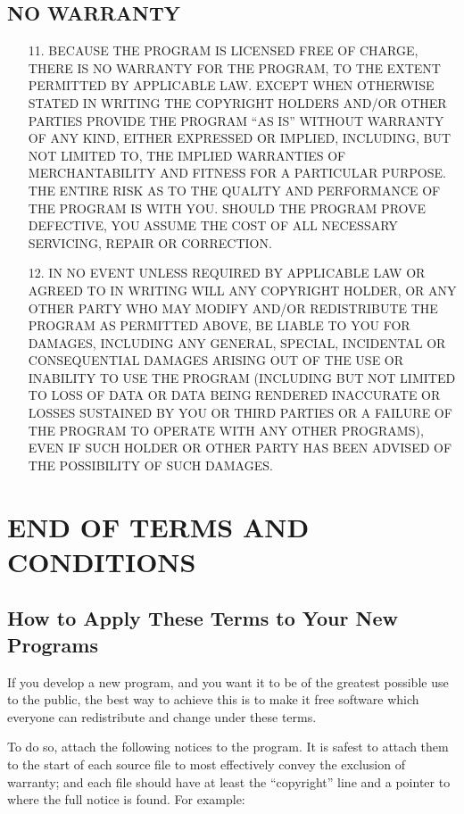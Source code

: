 \documentclass[oneside,english]{book}
\begin{document}
\subsection*{NO WARRANTY }

\begin{itemize}

\item[11.]BECAUSE THE PROGRAM IS LICENSED FREE OF CHARGE, THERE IS
NO WARRANTY FOR THE PROGRAM, TO THE EXTENT PERMITTED BY APPLICABLE
LAW. EXCEPT WHEN OTHERWISE STATED IN WRITING THE COPYRIGHT HOLDERS
AND/OR OTHER PARTIES PROVIDE THE PROGRAM ``AS IS'' WITHOUT WARRANTY
OF ANY KIND, EITHER EXPRESSED OR IMPLIED, INCLUDING, BUT NOT LIMITED
TO, THE IMPLIED WARRANTIES OF MERCHANTABILITY AND FITNESS FOR A PARTICULAR
PURPOSE. THE ENTIRE RISK AS TO THE QUALITY AND PERFORMANCE OF THE
PROGRAM IS WITH YOU. SHOULD THE PROGRAM PROVE DEFECTIVE, YOU ASSUME
THE COST OF ALL NECESSARY SERVICING, REPAIR OR CORRECTION.

\item[12.]IN NO EVENT UNLESS REQUIRED BY APPLICABLE LAW OR AGREED
TO IN WRITING WILL ANY COPYRIGHT HOLDER, OR ANY OTHER PARTY WHO MAY
MODIFY AND/OR REDISTRIBUTE THE PROGRAM AS PERMITTED ABOVE, BE LIABLE
TO YOU FOR DAMAGES, INCLUDING ANY GENERAL, SPECIAL, INCIDENTAL OR
CONSEQUENTIAL DAMAGES ARISING OUT OF THE USE OR INABILITY TO USE THE
PROGRAM (INCLUDING BUT NOT LIMITED TO LOSS OF DATA OR DATA BEING RENDERED
INACCURATE OR LOSSES SUSTAINED BY YOU OR THIRD PARTIES OR A FAILURE
OF THE PROGRAM TO OPERATE WITH ANY OTHER PROGRAMS), EVEN IF SUCH HOLDER
OR OTHER PARTY HAS BEEN ADVISED OF THE POSSIBILITY OF SUCH DAMAGES.

\end{itemize}


\section*{END OF TERMS AND CONDITIONS }


\subsection*{How to Apply These Terms to Your New Programs}

If you develop a new program, and you want it to be of the greatest
possible use to the public, the best way to achieve this is to make
it free software which everyone can redistribute and change under
these terms.

To do so, attach the following notices to the program. It is safest
to attach them to the start of each source file to most effectively
convey the exclusion of warranty; and each file should have at least
the ``copyright'' line and a pointer to where the full notice is found.
For example:
\end{document}
